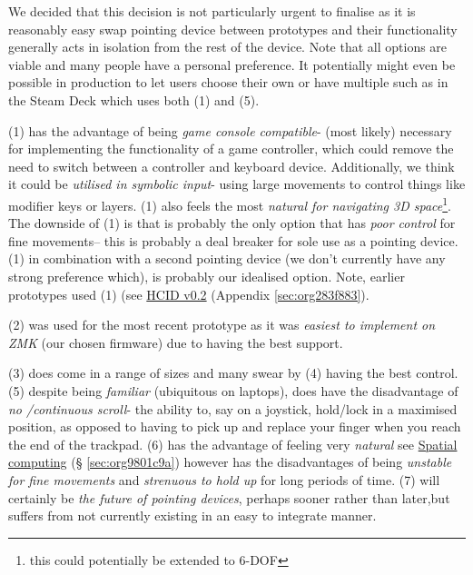 \documentclass[logo,bsc,singlespacing,parskip]{infthesis}
\begin{document}
We decided that this decision is not particularly urgent to finalise as it is reasonably easy swap pointing device between prototypes and their functionality generally acts in isolation from the rest of the device.
Note that all options are viable and many people have a personal preference.
It potentially might even be possible in production to let users choose their own or have multiple such as in the Steam Deck \autocite{SteamDeck2022}  which uses both (1) and (5).

(1) has the advantage of being \emph{game console compatible}- (most likely) necessary for implementing the functionality of a game controller, which could remove the need to switch between a controller and keyboard device.
Additionally, we think it could be \emph{utilised in symbolic input}- using large movements to control things like modifier keys or layers.
(1) also feels the most \emph{natural for navigating 3D space}\footnote{this could potentially be extended to 6-DOF}.
The downside of (1) is that is probably the only option that has \emph{poor control} for fine movements-- this is probably a deal breaker for sole use as a pointing device.
(1) in combination with a second pointing device (we don't currently have any strong preference which), is probably our idealised option.
Note, earlier prototypes used (1) (see \hyperref[sec:org283f883]{HCID v0.2} (Appendix \ref{sec:org283f883}).

(2) was used for the most recent prototype as it was \emph{easiest to implement on ZMK} (our chosen firmware) due to having the best support.

(3) does come in a range of sizes and many swear by (4) having the best control.
(5) despite being \emph{familiar} (ubiquitous on laptops), does have the disadvantage of \emph{no /continuous scroll}- the ability to, say on a joystick, hold/lock in a maximised position, as opposed to having to pick up and replace your finger when you reach the end of the trackpad.
(6) has the advantage of feeling very \emph{natural} see \hyperref[sec:org9801c9a]{Spatial computing} (§ \ref{sec:org9801c9a}) however has the disadvantages of being \emph{unstable for fine movements} and \emph{strenuous to hold up} for long periods of time.
(7) will certainly be \emph{the future of pointing devices}, perhaps sooner rather than later,but suffers from not currently existing in an easy to integrate manner.
\end{document}
